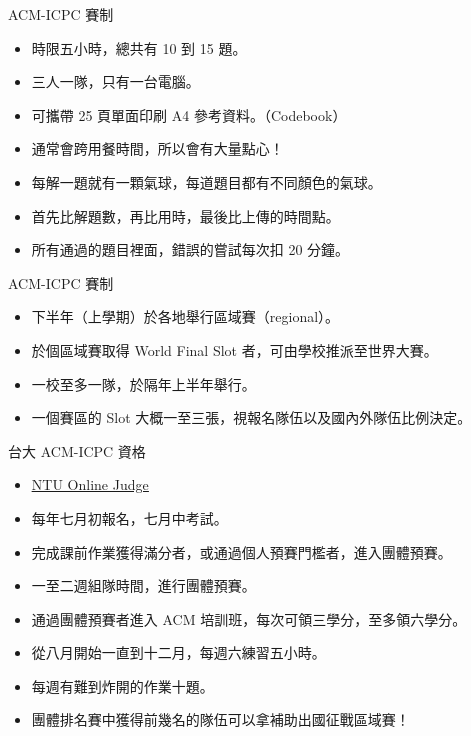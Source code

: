 \documentclass[t]{beamer}
\begin{document}
\begin{frame}{ACM-ICPC 賽制}
  \begin{itemize}
    \item 時限五小時，總共有 10 到 15 題。
    \item 三人一隊，只有一台電腦。
    \item 可攜帶 25 頁單面印刷 A4 參考資料。（Codebook）
    \item 通常會跨用餐時間，所以會有大量點心！
    \item 每解一題就有一顆氣球，每道題目都有不同顏色的氣球。
    \item 首先比解題數，再比用時，最後比上傳的時間點。
    \item 所有通過的題目裡面，錯誤的嘗試每次扣 20 分鐘。
  \end{itemize}
\end{frame}

\begin{frame}{ACM-ICPC 賽制}
  \begin{itemize}
    \item 下半年（上學期）於各地舉行區域賽（regional）。
    \item 於個區域賽取得 World Final Slot 者，可由學校推派至世界大賽。
    \item 一校至多一隊，於隔年上半年舉行。
    \item 一個賽區的 Slot 大概一至三張，視報名隊伍以及國內外隊伍比例決定。
  \end{itemize}
\end{frame}

\begin{frame}{台大 ACM-ICPC 資格}
  \begin{itemize}
    \item \href{http://acm.csie.org/ntujudge/index.php}{\underline{NTU Online Judge}}
    \item 每年七月初報名，七月中考試。
    \item 完成課前作業獲得滿分者，或通過個人預賽門檻者，進入團體預賽。
    \item 一至二週組隊時間，進行團體預賽。
    \item 通過團體預賽者進入 ACM 培訓班，每次可領三學分，至多領六學分。
    \item 從八月開始一直到十二月，每週六練習五小時。
    \item 每週有難到炸開的作業十題。
    \item 團體排名賽中獲得前幾名的隊伍可以拿補助出國征戰區域賽！
  \end{itemize}
\end{frame}
\end{document}

